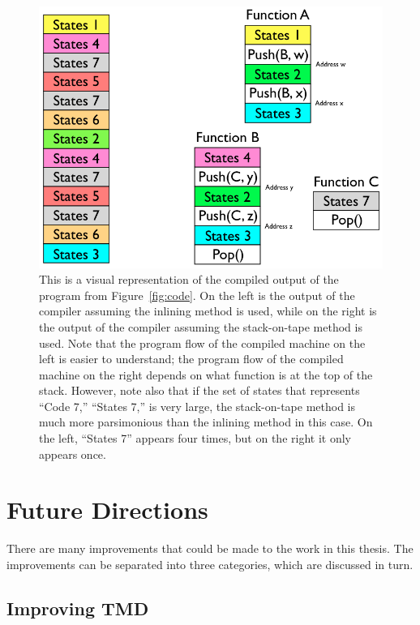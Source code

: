 \documentclass[11pt]{report}
\begin{document}
\begin{figure} 
\begin{center} 
\includegraphics[scale=0.6]{figs/compiled.png} 
\caption{This is a visual representation of the compiled output of the program from Figure~\ref{fig:code}. On the left is the output of the compiler assuming the inlining method is used, while on the right is the output of the compiler assuming the stack-on-tape method is used. Note that the program flow of the compiled machine on the left is easier to understand; the program flow of the compiled machine on the right depends on what function is at the top of the stack. However, note also that if the set of states that represents ``Code 7,'' ``States 7,'' is very large, the stack-on-tape method is much more parsimonious than the inlining method in this case. On the left, ``States 7'' appears four times, but on the right it only appears once. \label{fig:compiled}} 
\end{center} 
\end{figure}

\section{Future Directions}

There are many improvements that could be made to the work in this thesis. The improvements can be separated into three categories, which are discussed in turn.

\subsection{Improving TMD}
\end{document}
